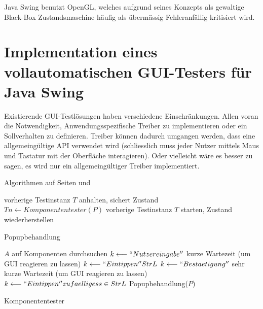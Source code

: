 Java Swing benutzt OpenGL, welches aufgrund seines Konzepts als gewaltige
Black-Box Zustandsmaschine häufig als übermässig Fehleranfällig kritisiert wird.


\section{Implementation eines vollautomatischen GUI-Testers für Java Swing}\label{section:myfullautoguitest}


Existierende GUI-Testlösungen haben verschiedene Einschränkungen. Allen voran die
Notwendigkeit, Anwendungsspezifische Treiber zu implementieren oder ein Sollverhalten zu definieren.
Treiber können dadurch umgangen werden, dass eine allgemeingültige API verwendet wird (schliesslich 
muss jeder Nutzer mittels Maus und Tastatur mit der Oberfläche interagieren). Oder vielleicht
wäre es besser zu sagen, es wird nur ein allgemeingültiger Treiber implementiert.



Algorithmen auf Seiten \pageref{alg:autotesterpopup} und \pageref{alg:autotestermain}


\begin{algorithm} \SetAlgoLined
	vorherige Testinstanz $T$ anhalten, sichert Zustand\;
	$Tn \longleftarrow Komponententester(P)$\;
	vorherige Testinstanz $T$ starten, Zustand wiederherstellen\;
	\caption{Popupbehandlung}
	\label{alg:autotesterpopup}
\end{algorithm}

\begin{algorithm} \SetAlgoLined
	$A$ auf Komponenten durchsuchen\;
	{
		{
			$k \longleftarrow ``Nutzereingabe''$\;
			kurze Wartezeit (um GUI reagieren zu lassen)
		}
		{
			{
				$k \longleftarrow ``Eintippen'' StrL$\;
				$k \longleftarrow ``Bestaetigung''$\;
				sehr kurze Wartezeit (um GUI reagieren zu lassen)
			}
			$k \longleftarrow ``Eintippen'' zufaelliges s \in StrL$\;
		}
		{
			Popupbehandlung($P$)\;
		}
	}
	\caption{Komponententester}
	\label{alg:autotestermain}
\end{algorithm}


